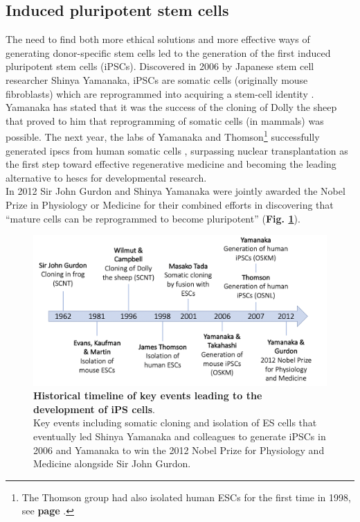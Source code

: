 \subsection{Induced pluripotent stem cells}
\label{sec:ipsc}

The need to find both more ethical solutions and more effective ways of generating donor-specific stem cells  led to the generation of the first induced pluripotent stem cells (iPSCs).
Discovered in 2006 by Japanese stem cell researcher Shinya Yamanaka, iPSCs are somatic cells (originally mouse fibroblasts) which are reprogrammed into acquiring a stem-cell identity \cite{takahashi2006induction}.
Yamanaka has stated that it was the success of the cloning of Dolly the sheep that proved to him that reprogramming of somatic cells (in mammals) was possible.
The next year, the labs of Yamanaka and Thomson\footnote{The Thomson group had also isolated human ESCs for the first time in 1998, see \textbf{page \pageref{sec:esc_induction}}.} successfully generated \glspl{ipsc} from human somatic cells \cite{takahashi2006induction, takahashi2007induction, yu2007induced}, surpassing nuclear transplantation as the first step toward effective regenerative medicine and becoming the leading alternative to \glspl{hesc} for developmental research.\\

In 2012 Sir John Gurdon and Shinya Yamanaka were jointly awarded the Nobel Prize in Physiology or Medicine for their combined efforts in discovering that “mature cells can be reprogrammed to become pluripotent” \cite{nobel2012press} (\textbf{Fig. \ref{fig:ipsc_timeline}}).    

\begin{figure}[h]
\centering
\includegraphics[width=15cm]{Chapter1/Fig/ipsc_timeline.png}
\caption[iPSCs timeline]{\textbf{Historical timeline of key events leading to the development of iPS cells}.\\
Key events including somatic cloning and isolation of ES cells that eventually led Shinya Yamanaka and colleagues to generate iPSCs in 2006 and Yamanaka to win the 2012 Nobel Prize for Physiology and Medicine alongside Sir John Gurdon.}
\label{fig:ipsc_timeline}
\end{figure}

